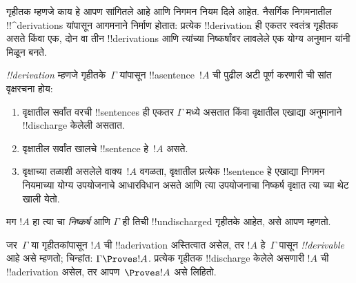 \documentclass[../../../include/open-logic-section]{subfiles}
\begin{document}
      {}
      {}


\begin{explain}
गृहीतक म्हणजे काय हे आपण सांगितले आहे आणि निगमन नियम दिले आहेत.
नैसर्गिक निगमनातील !!^{derivation}s यांपासून आगमनाने निर्माण होतात:
प्रत्येक !!{derivation} ही एकतर स्वतंत्र गृहीतक असते किंवा एक, दोन वा तीन
!!{derivation}s आणि त्यांच्या निष्कर्षांवर लावलेले एक योग्य अनुमान यांनी मिळून बनते.
\end{explain}

\begin{defn}[!!^{derivation}]
 \emph{!!{derivation}} म्हणजे गृहीतके~$\Gamma$
यांपासून !!a{sentence}~$!A$ ची पुढील अटी पूर्ण करणारी ची
सांत वृक्षरचना होय:
\begin{enumerate}
\item वृक्षातील सर्वांत वरची !!{sentence}s ही एकतर $\Gamma$ मध्ये असतात
  किंवा वृक्षातील एखाद्या अनुमानाने !!{discharge} केलेली असतात.
\item वृक्षातील सर्वांत खालचे !!{sentence} हे~$!A$ असते.
\item वृक्षाच्या तळाशी असलेले वाक्य~$!A$ वगळता, वृक्षातील प्रत्येक
  !!{sentence} हे एखाद्या निगमन नियमाच्या योग्य उपयोजनाचे आधारविधान असते
  आणि त्या उपयोजनाचा निष्कर्ष वृक्षात त्या च्या थेट खाली येतो.
\end{enumerate}
मग $!A$ हा त्या चा \emph{निष्कर्ष} आणि $\Gamma$ ही तिची
!!{undischarged} गृहीतके आहेत, असे आपण म्हणतो.

जर~$\Gamma$ या गृहीतकांपासून $!A$ ची !!a{derivation} अस्तित्वात असेल, तर
$!A$ हे~$\Gamma$ पासून \emph{!!{derivable}} आहे असे म्हणतो; चिन्हांत:
$\Gamma \Proves !A$. प्रत्येक गृहीतक !!{discharge} केलेले असणारी $!A$
ची !!a{derivation} असेल, तर आपण~$\Proves !A$ असे लिहितो.
\end{defn}
\end{document}
